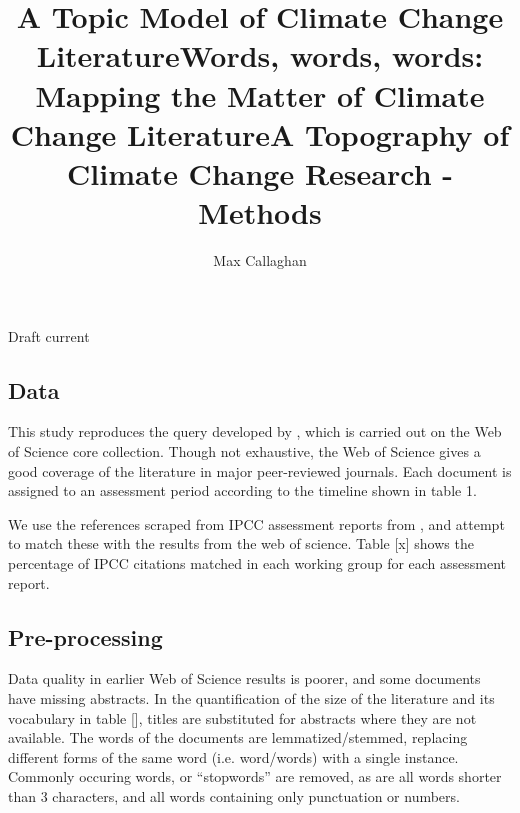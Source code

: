 \documentclass{article}
\makeatletter
\renewcommand{\maketitle}{\bgroup\setlength{\parindent}{0pt}
	\begin{flushleft}
		
		{\huge\textbf{\@title}}
		
		\bigskip
		
		{\large\textbf{\@author}}
		
		\bigskip
		
		{\large{Draft current \@date}}
		
	\end{flushleft}\egroup
}
\makeatother
\begin{document}
	\title{A Topic Model of Climate Change Literature}
	\title{Words, words, words: Mapping the Matter of Climate Change Literature}
	\title{A Topography of Climate Change Research - Methods}
	\author[1,2]{Max Callaghan}
	
	\maketitle
	\begin{linenumbers}
	
	\setcounter{figure}{0}
	\renewcommand\thefigure{SI.\arabic{figure}}  
		
	\subsection*{Data}
	
	This study reproduces the query developed by \citep{Grieneisen2011}, which is carried out on the Web of Science core collection. Though not exhaustive, the Web of Science gives a good coverage of the literature in major peer-reviewed journals.	Each document is assigned to an assessment period according to the timeline shown in table 1.
	
	We use the references scraped from IPCC assessment reports from \citep{Minx2017l}, and attempt to match these with the results from the web of science. Table \todo{}[x] shows the percentage of IPCC citations matched in each working group for each assessment report.
		
	\subsection*{Pre-processing}
	
	Data quality in earlier Web of Science results is poorer, and some documents have missing abstracts. In the quantification of the size of the literature and its vocabulary in table [], titles are substituted for abstracts where they are not available.  The words of the documents are lemmatized/stemmed, replacing different forms of the same word (i.e. word/words) with a single instance. Commonly occuring words, or ``stopwords'' are removed, as are all words shorter than 3 characters, and all words containing only punctuation or numbers.
	

\end{linenumbers}
\end{document}
